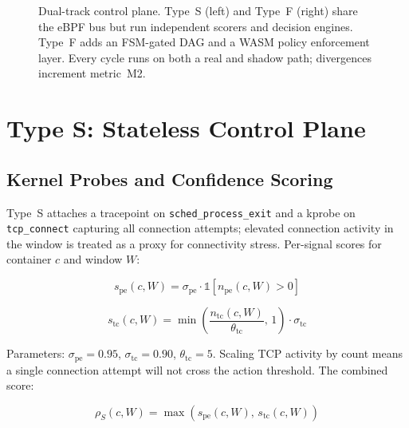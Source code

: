 \documentclass[conference]{IEEEtran}
\begin{document}
\begin{figure}[!t]
\caption{Dual-track control plane. Type~S (left) and Type~F (right) share the eBPF bus but run independent scorers and decision engines. Type~F adds an FSM-gated DAG and a WASM policy enforcement layer. Every cycle runs on both a real and shadow path; divergences increment metric~M2.}
\label{fig:arch}
\end{figure}

\section{Type S: Stateless Control Plane}
\label{sec:types}

\subsection{Kernel Probes and Confidence Scoring}

Type~S attaches a tracepoint on \texttt{sched\_process\_exit} and a kprobe on \texttt{tcp\_connect} capturing all connection attempts; elevated connection activity in the window is treated as a proxy for connectivity stress. Per-signal scores for container $c$ and window $W$:

\begin{equation}
s_{\mathrm{pe}}(c, W) = \sigma_{\mathrm{pe}} \cdot \mathbb{1}\!\left[n_{\mathrm{pe}}(c, W) > 0\right]
\label{eq:spe}
\end{equation}

\begin{equation}
s_{\mathrm{tc}}(c, W) = \min\!\left(\frac{n_{\mathrm{tc}}(c, W)}{\theta_{\mathrm{tc}}},\, 1\right) \cdot \sigma_{\mathrm{tc}}
\label{eq:stc}
\end{equation}

Parameters: $\sigma_{\mathrm{pe}} = 0.95$, $\sigma_{\mathrm{tc}} = 0.90$, $\theta_{\mathrm{tc}} = 5$. Scaling TCP activity by count means a single connection attempt will not cross the action threshold. The combined score:

\begin{equation}
\rho_S(c, W) = \max(s_{\mathrm{pe}}(c, W),\, s_{\mathrm{tc}}(c, W))
\label{eq:rhoS}
\end{equation}
\end{document}
